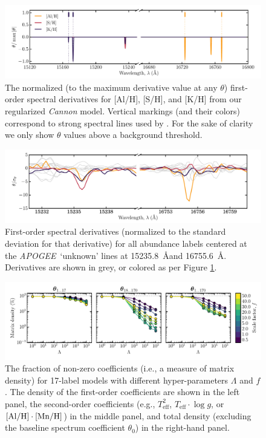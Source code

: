 \documentclass[12pt,preprint]{aastex}
\newcommand{\project}[1]{\textsl{#1}}
\newcommand{\acronym}[1]{{\small{#1}}}
\newcommand{\apogee}{\project{\acronym{APOGEE}}}
\newcommand{\logg}{\log g}
\newcommand{\Teff}{T_{\mathrm{eff}}}
\begin{document}
\clearpage

\begin{figure}[p]
\includegraphics[width=\textwidth]{line-identification.pdf}
\caption{The normalized (to the maximum derivative value at any $\theta$) first-order spectral derivatives for [Al/H], [S/H], and [K/H] from our regularized \emph{Cannon} model. Vertical markings (and their colors) correspond to strong spectral lines used by \citet{Smith}. For the sake of clarity we only show $\theta$ values above a background threshold.\label{fig:line-identification}}
\end{figure}

\clearpage

\begin{figure}[p]
\centering
\includegraphics[width=\textwidth]{line-identification-zoom.pdf}
\caption{First-order spectral derivatives (normalized to the standard deviation for that derivative) for all abundance labels centered at the \apogee\ `unknown' lines at 15235.8~\AA and 16755.6~\AA. Derivatives are shown in grey, or colored as per Figure \ref{fig:line-identification}.\label{fig:line-identification-2}}
\end{figure}

\clearpage

\begin{figure}[p]
\centering
\includegraphics[width=\textwidth]{sparsity.pdf}
\caption{The fraction of non-zero coefficients (i.e., a measure of matrix density) for 17-label models with different hyper-parameters $\Lambda$ and $f$.  The density of the first-order coefficients are shown in the left panel, the second-order coefficients (e.g., $\Teff^2$, $\Teff\cdot\logg$, or $[\rm{Al}/\rm{H}]\cdot[\rm{Mn}/\rm{H}]$) in the middle panel, and total density (excluding the baseline spectrum coefficient $\theta_0$) in the right-hand panel.\label{fig:sparsity}}
\end{figure}
\end{document}
